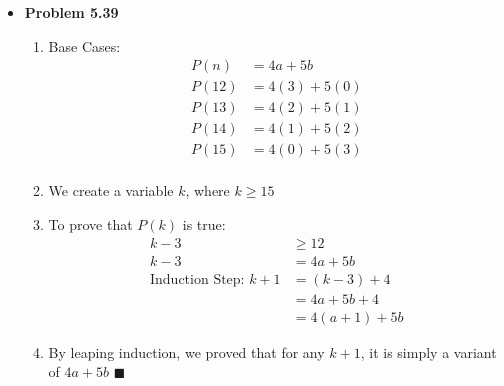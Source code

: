 \documentclass{article}
\begin{document}
\begin{itemize}
        \item \textbf{Problem 5.39}
        \begin{enumerate}
            \item Base Cases:
            \begin{align*}
                P(n) &= 4a + 5b\\
                P(12) &= 4(3) + 5(0)\\
                P(13) &= 4(2) + 5(1)\\
                P(14) &= 4(1) + 5(2)\\
                P(15) &= 4(0) + 5(3)\\
            \end{align*}
            \item We create a variable $k$, where $k \geq 15$
            \item To prove that $P(k)$ is true:
            \begin{align*}
                k - 3 &\geq 12 \\
                k - 3 &= 4a + 5b\\
                \text{Induction Step: }k + 1 &= (k-3) + 4\\
                &= 4a + 5b + 4\\
                &= 4(a + 1) + 5b
            \end{align*}
            \item By leaping induction, we proved that for any $k + 1$, it is simply a variant of $4a + 5b$ $\blacksquare$
        \end{enumerate}

        
        

\end{itemize}
\end{document}
